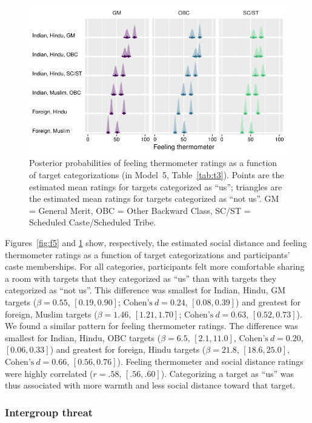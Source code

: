 \documentclass[12pt, a4paper]{article}
\begin{document}
\begin{figure}[t!]
\centering
\includegraphics[scale=1]{../figures/figure-6}
\caption{
Posterior probabilities of feeling thermometer ratings as a function of target categorizations (in Model~5, Table~\ref{tab:t3}). Points are the estimated mean ratings for targets categorized as ``us''; triangles are the estimated mean ratings for targets categorized as ``not us''. GM = General Merit, OBC = Other Backward Class, SC/ST = Scheduled Caste/Scheduled Tribe.
}
\label{fig:f6}
\end{figure}

Figures~\ref{fig:f5} and \ref{fig:f6} show, respectively, the estimated social distance and feeling thermometer ratings as a function of target categorizations and participants' caste memberships. For all categories, participants felt more comfortable sharing a room with targets that they categorized as ``us'' than with targets they categorized as ``not us''. This difference was smallest for Indian, Hindu, GM targets ($\beta = 0.55$, $[0.19, 0.90]$; $\text{Cohen's}~d = 0.24$, $[0.08, 0.39]$) and greatest for foreign, Muslim targets ($\beta = 1.46$, $[1.21, 1.70]$; $\text{Cohen's}~d = 0.63$, $[0.52, 0.73]$). We found a similar pattern for feeling thermometer ratings. The difference was smallest for Indian, Hindu, OBC targets ($\beta = 6.5$, $[2.1, 11.0]$, $\text{Cohen's}~d = 0.20$, $[0.06, 0.33]$) and greatest for foreign, Hindu targets ($\beta = 21.8$, $[18.6, 25.0]$, $\text{Cohen's}~d = 0.66$, $[0.56, 0.76]$). Feeling thermometer and social distance ratings were highly correlated ($r = .58$, $[.56, .60]$). Categorizing a target as ``us'' was thus associated with more warmth and less social distance toward that target.

\subsubsection{Intergroup threat}
\end{document}
